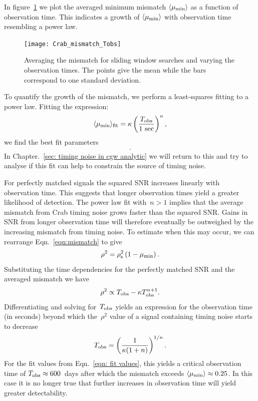 \documentclass[../full_thesis/full_thesis.tex]{subfiles}
\newcommand{\thisdir}{../timing_noise_in_CGW}
\begin{document}
In figure~\ref{fig: mismatch Tobs} we plot the averaged minimum
mismatch $\langle\mu_{\mathrm{min}}\rangle$ as a function of observation time.
This indicates a growth of $\langle\mu_{\mathrm{min}}\rangle$ with observation time
resembling a power law.
\begin{figure}[ht]
\centering
\texttt{[image: Crab\_mismatch\_Tobs]}
\caption{Averaging the mismatch for sliding window searches and varying the
observation times. The points give the mean while the bars correspond to one
standard deviation.}
\label{fig: mismatch Tobs}
\end{figure}

To quantify the growth of the mismatch, we perform a least-squares fitting
to a power law. Fitting the expression:
\begin{equation}
\langle\mu_{\mathrm{min}}\rangle_{\textrm{fit}} = \kappa
                                   \left(\frac{T_{\textrm{obs}}}{1\textrm{ sec}}\right)^{n},
\end{equation}
we find the best fit parameters
\begin{align}
    .
    \label{eqn: fit values}
\end{align}
In Chapter.~\ref{sec: timing noise in cgw analytic} we will return to this
and try to analyse if this fit can help to constrain the source of timing noise.

For perfectly matched signals the squared SNR
increases linearly \citep{Prix2009} with observation time.
This suggests that longer observation
times yield a greater likelihood of detection. The power law fit with~$n > 1$
implies that the average mismatch from
Crab timing noise grows faster than the squared SNR.
Gains in
SNR from longer observation time will therefore eventually be
outweighed by the increasing mismatch from timing noise.
To estimate when this may occur, we can rearrange Eqn.~\eqref{eqn:mismatch}
to give
\begin{equation}
    \rho^{2} = \rho^{2}_{\mathrm{s}}\left(1 - \mu_{\mathrm{min}}\right).
\end{equation}
Substituting the time dependencies for the perfectly matched SNR and the
averaged mismatch we have
\begin{equation}
    \rho^{2} \propto T_{\textrm{obs}} - \kappa T_{\textrm{obs}}^{n+1}.
\end{equation}
Differentiating and solving for~$T_{\textrm{obs}}$ yields an expression for the
observation time (in seconds)
beyond which the~$\rho^{2}$ value of a signal containing timing
noise starts to decrease
\begin{equation}
T_{\textrm{obs}} = \left(\frac{1}{\kappa(1+n)}\right)^{1/n}.
\end{equation}
For the fit values from Eqn.~\eqref{eqn: fit values}, this yields
a critical observation time of
$T_{\textrm{obs}}\approx 600$~days after which the mismatch exceeds
$\langle\mu_{\mathrm{min}}\rangle \approx 0.25$.
In this case it is no longer true that further increases in
observation time will yield greater detectability.
\end{document}
